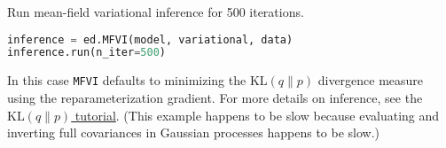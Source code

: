 Run mean-field variational inference for 500 iterations.
\begin{lstlisting}[language=Python]
inference = ed.MFVI(model, variational, data)
inference.run(n_iter=500)
\end{lstlisting}
In this case
\texttt{MFVI} defaults to minimizing the
$\text{KL}(q\|p)$ divergence measure using the reparameterization
gradient.
For more details on inference, see the \href{tut_KLqp.html}{$\text{KL}(q\|p)$ tutorial}.
(This example happens to be slow because evaluating and inverting full
covariances in Gaussian processes happens to be slow.)


